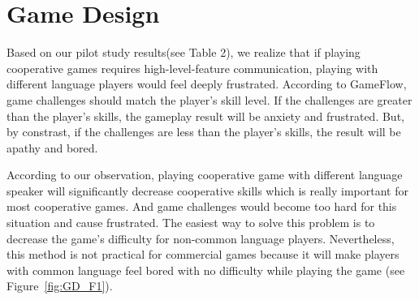 \section{Game Design}


Based on our pilot study results(see Table 2), we realize that if playing cooperative games requires high-level-feature communication, playing with different language players would feel deeply frustrated. According to GameFlow\cite{GD1}, game challenges should match the player's skill level. If the challenges are greater than the player's skills, the gameplay result will be anxiety and frustrated. But, by constrast, if the challenges are less than the player's skills, the result will be apathy and bored.


According to our observation, playing cooperative game with different language speaker will significantly decrease cooperative skills which is really important for most cooperative games. And game challenges would become too hard for this situation and cause frustrated. The easiest way to solve this problem is to decrease the game's difficulty for non-common language players. Nevertheless, this method is not practical for commercial games because it will make players with common language feel bored with no difficulty while playing the game (see Figure~\ref{fig:GD_F1}).  

